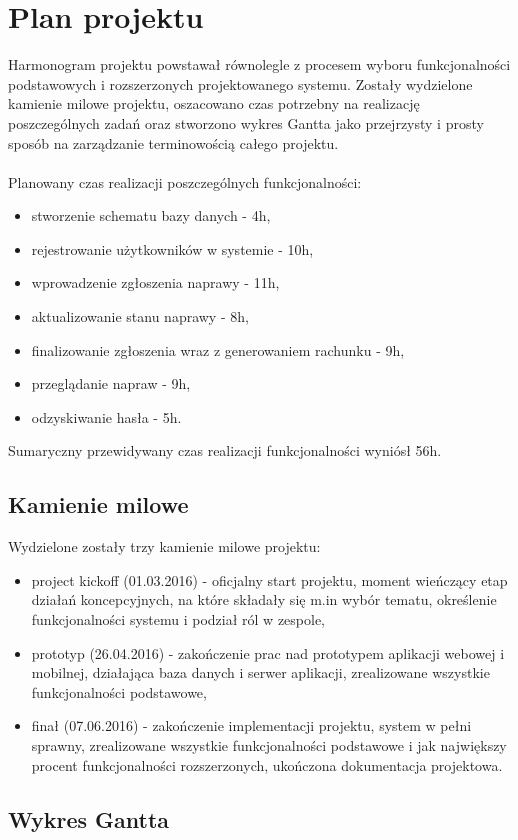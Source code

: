 \documentclass[a4paper,11pt]{article}
\begin{document}
\section{Plan projektu}
Harmonogram projektu powstawał równolegle z procesem wyboru funkcjonalności podstawowych i rozszerzonych projektowanego systemu. Zostały wydzielone kamienie milowe projektu, oszacowano czas potrzebny na realizację poszczególnych zadań oraz stworzono wykres Gantta jako przejrzysty i prosty sposób na zarządzanie terminowością całego projektu.
\\\\Planowany czas realizacji poszczególnych funkcjonalności:
\begin{itemize}
	\item stworzenie schematu bazy danych - 4h, 
	\item rejestrowanie użytkowników w systemie - 10h, 
	\item wprowadzenie zgłoszenia naprawy - 11h,
	\item aktualizowanie stanu naprawy - 8h,
	\item finalizowanie zgłoszenia wraz z generowaniem rachunku - 9h,
	\item przeglądanie napraw - 9h,
	\item odzyskiwanie hasła - 5h.
\end{itemize}
Sumaryczny przewidywany czas realizacji funkcjonalności wyniósł 56h.
\subsection{Kamienie milowe}
Wydzielone zostały trzy kamienie milowe projektu:
\begin{itemize}
	\item project kickoff (01.03.2016) - oficjalny start projektu, moment wieńczący etap działań koncepcyjnych, na które składały się m.in wybór tematu, określenie funkcjonalności systemu i podział ról w zespole,
	\item prototyp (26.04.2016) - zakończenie prac nad prototypem aplikacji webowej i mobilnej, działająca baza danych i serwer aplikacji, zrealizowane wszystkie funkcjonalności podstawowe,
	\item finał (07.06.2016) - zakończenie implementacji projektu, system w pełni sprawny, zrealizowane wszystkie funkcjonalności podstawowe i jak największy procent funkcjonalności rozszerzonych, ukończona dokumentacja projektowa.
\end{itemize}
\subsection{Wykres Gantta}
\end{document}
